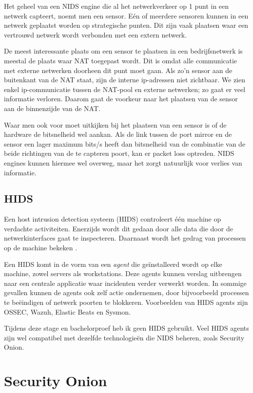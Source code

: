 \documentclass[a4paper,12pt]{report}
\begin{document}
Het geheel van een NIDS engine die al het netwerkverkeer op 1 punt in een netwerk capteert, noemt men een sensor.
Eén of meerdere sensoren kunnen in een netwerk geplaatst worden op strategische punten.
Dit zijn vaak plaatsen waar een vertrouwd netwerk wordt verbonden met een extern netwerk.

De meest interessante plaats om een sensor te plaatsen in een bedrijfsnetwerk is meestal de plaats waar NAT toegepast wordt.
Dit is omdat alle communicatie met externe netwerken doorheen dit punt moet gaan.
Als zo'n sensor aan de buitenkant van de NAT staat, zijn de interne ip-adressen niet zichtbaar.
We zien enkel ip-communicatie tussen de NAT-pool en externe netwerken; zo gaat er veel informatie verloren.
Daarom gaat de voorkeur naar het plaatsen van de sensor aan de binnenzijde van de NAT.

Waar men ook voor moet uitkijken bij het plaatsen van een sensor is of de hardware de bitsnelheid wel aankan.
Als de link tussen de port mirror en de sensor een lager maximum bits/s heeft dan bitsnelheid van de combinatie van de beide richtingen van de te capteren poort, kan er packet loss optreden.
NIDS engines kunnen hiermee wel overweg, maar het zorgt natuurlijk voor verlies van informatie.

\section{HIDS}
Een host intrusion detection systeem (HIDS) controleert één machine op verdachte activiteiten.
Enerzijds wordt dit gedaan door alle data die door de netwerkinterfaces gaat te inspecteren.
Daarnaast wordt het gedrag van processen op de machine bekeken \autocite{wikipedia:hids}.

Een HIDS komt in de vorm van een \emph{agent} die geïnstalleerd wordt op elke machine, zowel servers als workstations.
Deze agents kunnen verslag uitbrengen naar een centrale applicatie waar incidenten verder verwerkt worden.
In sommige gevallen kunnen de agents ook zelf actie ondernemen, door bijvoorbeeld processen te beëindigen of netwerk poorten te blokkeren.
Voorbeelden van HIDS agents zijn OSSEC, Wazuh, Elastic Beats en Sysmon.

Tijdens deze stage en bachelorproef heb ik geen HIDS gebruikt.
Veel HIDS agents zijn wel compatibel met dezelfde technologieën die NIDS beheren, zoals Security Onion.

\chapter{Security Onion}
\end{document}
